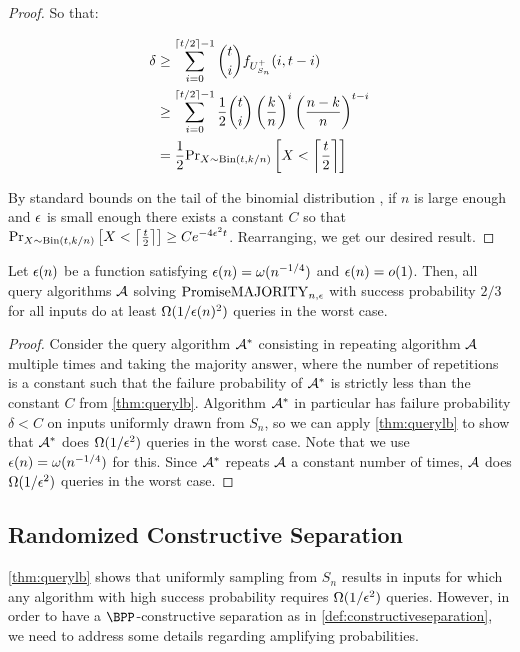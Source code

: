 \begin{proof}
So that:

\begin{align*}
\delta & \geq \sum_{i=0}^{\lceil t/2 \rceil-1} \binom{t}{i} f_{U^+_{S_n}}(i, t-i) \\
       & \geq \sum_{i=0}^{\lceil t/2 \rceil-1} \frac{1}{2} \binom{t}{i} \left(\frac{k}{n}\right)^i \left(\frac{n-k}{n} \right)^{t-i} \\
       & = \frac{1}{2} \text{Pr}_{X \sim \text{Bin}(t, k/n)}\left[X < \left\lceil \frac{t}{2} \right\rceil\right]
\end{align*}

By standard bounds on the tail of the binomial distribution \cite{Feller43},
if $n$ is large enough and $\epsilon$ is small enough there exists a constant $C$ so that 
$\text{Pr}_{X \sim \text{Bin}(t, k/n)}\left[X < \left\lceil \frac{t}{2} \right\rceil\right] \geq C e^{-4\epsilon^2t}$.
Rearranging, we get our desired result. 

\end{proof}

\begin{corollary}
    \label{cor:querylbgen}
Let $\epsilon(n)$ be a function satisfying $\epsilon(n) = \omega(n^{-1/4})$ and $\epsilon(n) = o(1)$. Then, all query
algorithms $\mathcal{A}$ solving $\mathrm{PromiseMAJORITY}_{n,\epsilon}$ with success probability $2/3$ for all inputs do at least $\Omega(1/\epsilon(n)^2)$
queries in the worst case. 
\end{corollary}
\begin{proof}
Consider the query algorithm $\mathcal{A}^*$ consisting in repeating algorithm $\mathcal{A}$  multiple times and 
taking the majority answer, where the number of repetitions is a constant such
that the failure probability of $\mathcal{A}^*$ is strictly less than 
the constant $C$ from \cref{thm:querylb}. 
Algorithm $\mathcal{A}^*$ in particular has failure probability $\delta < C$ on inputs 
uniformly drawn from $S_n$, so we can apply \cref{thm:querylb} to show that
$\mathcal{A}^*$ does $\Omega(1/\epsilon^2)$ queries in the worst case. Note that we use $\epsilon(n) = \omega(n^{-1/4})$
for this.
Since $\mathcal{A}^*$ repeats $\mathcal{A}$ a constant number of times, $\mathcal{A}$ does $\Omega(1/\epsilon^2)$ queries in the worst case. 
\end{proof}

\subsection{Randomized Constructive Separation}

\cref{thm:querylb} shows that uniformly sampling from $S_n$ results in inputs for which 
any algorithm with high success probability requires $\Omega(1/\epsilon^2)$ queries. 
However, in order to have a $\BPP$-constructive separation as in \cref{def:constructiveseparation},
we need to address some details regarding amplifying probabilities. 

